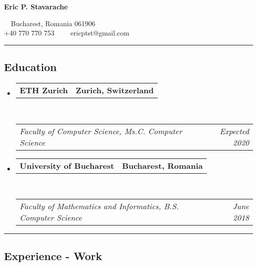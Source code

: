 \documentclass[10pt,letterpaper]{article}
\makeatletter
\newcommand{\headerrow}[2]
{\begin{tabular*}{\linewidth}{l@{\extracolsep{\fill}}r}
	#1 &
	#2 \\
\end{tabular*}}
\makeatother
\begin{document}
\begin{center}
{\LARGE \textbf{Eric P. Stavarache}}

\ \ Bucharest, Romania 061906
\\
+40 770 770 753\ \ \textbullet
\ \ ericptst@gmail.com
\end{center}

\hrule
\vspace{-1em}

\subsection*{Education}

\begin{itemize}
	\parskip=0.1em

	\item
	\headerrow
		{\textbf{ETH Zurich}}
		{\textbf{Zurich, Switzerland}}
	\\
	\headerrow
		{\emph{Faculty of Computer Science, Ms.C. Computer Science}}
		{\emph{Expected 2020}}

	\item
	\headerrow
		{\textbf{University of Bucharest}}
		{\textbf{Bucharest, Romania}}
	\\
	\headerrow
		{\emph{Faculty of Mathematics and Informatics, B.S. Computer Science}}
		{\emph{June 2018}}

\end{itemize}

\hrule
\vspace{-1em}
\subsection*{Experience - Work}
\end{document}

